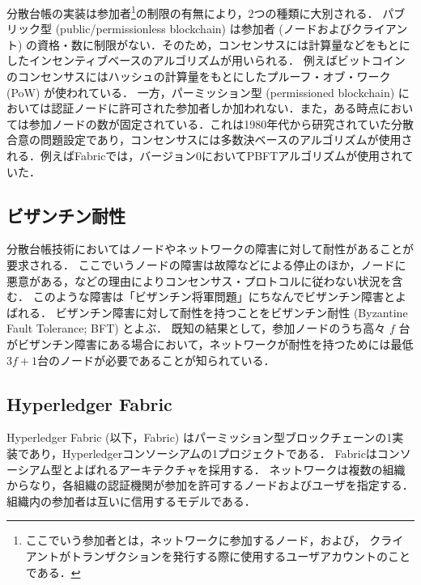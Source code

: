 \documentclass{fose2019}           %
\begin{document}
分散台帳の実装は参加者\footnote{ここでいう参加者とは，ネットワークに参加するノード，および，
クライアントがトランザクションを発行する際に使用するユーザアカウントのことである．}の制限の有無により，2つの種類に大別される．
パブリック型 (public/permissionless blockchain) は参加者 (ノードおよびクライアント) の資格・数に制限がない．そのため，コンセンサスには計算量などをもとにしたインセンティブベースのアルゴリズムが用いられる．
例えばビットコインのコンセンサスにはハッシュの計算量をもとにしたプルーフ・オブ・ワーク (PoW) が使われている．
一方，パーミッション型 (permissioned blockchain) においては認証ノードに許可された参加者しか加われない．また，ある時点においては参加ノードの数が固定されている．これは1980年代から研究されていた分散合意の問題設定であり，コンセンサスには多数決ベースのアルゴリズムが使用される．例えばFabricでは，バージョン0においてPBFTアルゴリズム\cite{Castro:PBFT:1999}が使用されていた．

\subsection{ビザンチン耐性}

分散台帳技術においてはノードやネットワークの障害に対して耐性があることが要求される．
ここでいうノードの障害は故障などによる停止のほか，ノードに悪意がある，などの理由によりコンセンサス・プロトコルに従わない状況を含む．
このような障害は「ビザンチン将軍問題」\cite{byzgen}にちなんでビザンチン障害とよばれる．
ビザンチン障害に対して耐性を持つことをビザンチン耐性 (Byzantine Fault Tolerance; BFT) とよぶ．
既知の結果として，参加ノードのうち高々 $f$ 台がビザンチン障害にある場合において，ネットワークが耐性を持つためには最低$3f+1$台のノードが必要であることが知られている．%

\subsection{Hyperledger Fabric}

Hyperledger Fabric\cite{fabric} (以下，Fabric) はパーミッション型ブロックチェーンの1実装であり，Hyperledgerコンソーシアムの1プロジェクトである．
Fabricはコンソーシアム型とよばれるアーキテクチャを採用する．
ネットワークは複数の組織からなり，各組織の認証機関が参加を許可するノードおよびユーザを指定する．
組織内の参加者は互いに信用するモデルである．

\end{document}
